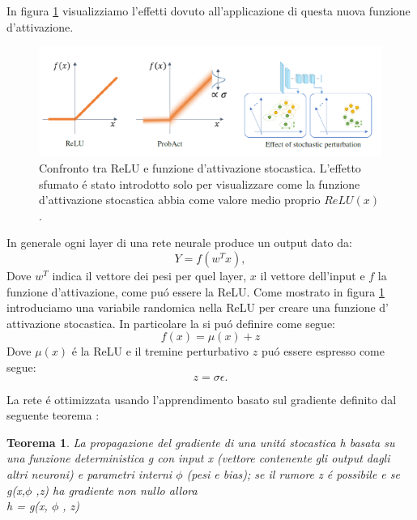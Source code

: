 \documentclass[a4paper,12pt]{report}
\begin{document}
 In figura \ref{ProbActEffectpng} visualizziamo l'effetti dovuto all'applicazione di questa nuova funzione d'attivazione. 
 \begin{figure}[h!]
  \centering
  \includegraphics[scale=0.6]{ProbActEffect.png} 
  \caption{Confronto tra ReLU e funzione d'attivazione stocastica. L'effetto sfumato \'e stato introdotto solo per visualizzare come la funzione d'attivazione stocastica abbia come valore medio proprio $ReLU(x)$.}
  \label{ProbActEffectpng}
 \end{figure}
 
 In generale ogni layer di una rete neurale produce un output dato da:
 \begin{equation} 
  Y = f\left(w^{T} x\right), 
 \end{equation} 
 Dove $w^{T}$ indica il vettore dei pesi per quel layer, $x$ il vettore dell'input e $f$ la funzione d'attivazione, come pu\'o  essere la ReLU. 
 Come mostrato in figura \ref{ProbActEffectpng} introduciamo una variabile randomica nella ReLU per creare una funzione d' attivazione stocastica. 
 In particolare la si pu\'o definire come segue:
 \begin{equation} 
  f\left(x\right) = \mu \left(x\right) + z
 \end{equation} 
 Dove $\mu\left(x\right)$ \'e la ReLU e il tremine perturbativo $z$ pu\'o essere espresso come segue:
 \begin{equation} 
  z = \sigma  \epsilon. 
 \end{equation} 
 
 La rete \'e ottimizzata usando l'apprendimento basato sul gradiente definito dal seguente teorema \cite{lee2019probact}:
 \newtheorem{teorema}{Teorema}
 
 \begin{teorema} \label{GradienPropth}
  La propagazione del gradiente di una unit\'a stocastica h basata su una funzione deterministica g con input x (vettore contenente gli output dagli altri neuroni) e parametri interni $\phi$ (pesi e bias); se il rumore z \'e possibile e se g(x,$\phi$ ,z) ha gradiente non nullo allora\\
  
  \centering
  h = g(x, $\phi$ , z)
 \end{teorema}
\end{document}
